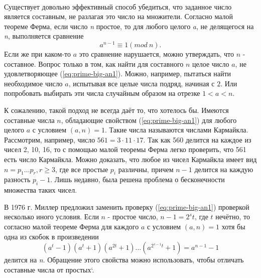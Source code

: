 \paragraph{} Существует довольно эффективный способ убедиться, что заданное число является составным, не разлагая это число на множители. 
Согласно малой теореме Ферма, если число \textit{n} простое, то для любого целого \textit{a}, не делящегося на \textit{n}, выполняется сравнение
\begin{equation} \label{eq:prime-big-an1}
 a^{ n-1} \equiv 1 (mod \: n).
\end{equation}
Если же при каком-то {$a$} это сравнение нарушается, можно утверждать, что {$n$} - составное. Вопрос только в том, как найти для составного {$n$}
целое число {$a$}, не удовлетворяющее (\ref{eq:prime-big-an1}). Можно, например, пытаться найти необходимое число {$a$}, испытывая все целые числа подряд, 
начиная с {$2$}. Или попробовать выбирать эти числа случайным образом на отрезке {$1 < a < n$}.

  К сожалению, такой подход не всегда даёт то, что хотелось бы. Имеются составные числа {$n$}, обладающие свойством (\ref{eq:prime-big-an1}) для любого целого
{$a$} с условием {$(a, n) = 1$}. Такие числа называются числами Кармайкла. Рассмотрим, например, число {$561 = 3 \cdot 11 \cdot 17$}. 
Так как 560 делится на каждое из чисел 2, 10, 16, то с помощью малой теоремы Ферма легко проверить, что 561 есть число Кармайкла. 
Можно доказать, что любое из чисел Кармайкла имеет вид {$n = p_{1} \dots p_{r}, r \geq 3$}, 
где все простые {$p_{i}$} различны, причем {$n - 1$} делится на каждую разность {$p_{i} - 1$}. 
Лишь недавно, была решена проблема о бесконечности множества таких чисел.

  В 1976 г. Миллер предложил заменить проверку (\ref{eq:prime-big-an1}) проверкой несколько иного условия. Если {$n$} - простое число, 
{$n - 1 = 2^{ s} t$}, где {$t$} нечётно, то согласно малой теореме Ферма для каждого {$a$} с 
условием {$(a, n) = 1$} хотя бы одна из скобок в произведении
\begin{equation} \label{eq:prime-big-at1}
 (a^{ t} - 1)(a^{ t} + 1)(a^{ 2 t} + 1) \dots (a^{ 2^{ s - 1}t} + 1) = a^{ n - 1} - 1
\end{equation}
делится на \textit{n}. Обращение этого свойства можно использовать, чтобы отличать составные числа от простых`.

